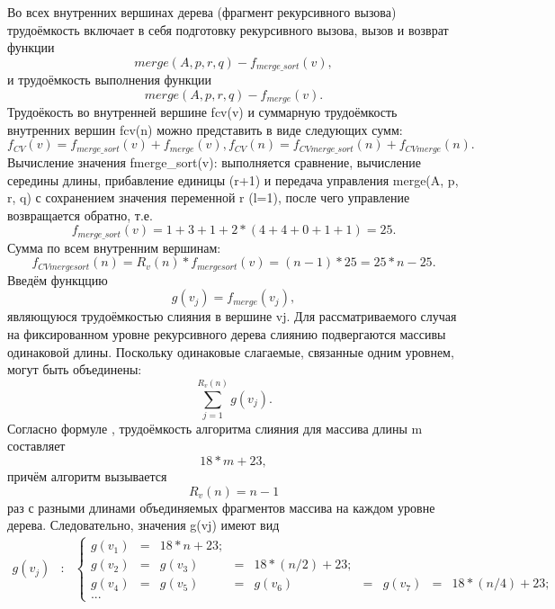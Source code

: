 \documentclass[12pt,a4paper]{scrartcl}
\begin{document}
Во всех внутренних вершинах дерева (фрагмент рекурсивного вызова) трудоёмкость включает в себя подготовку рекурсивного вызова, вызов и возврат функции 
\begin{equation*}
merge(A, p, r, q) - f_{merge\_sort}(v),
\end{equation*}
и трудоёмкость выполнения функции
\begin{equation*}
merge(A, p, r, q) - f_{merge}(v).
\end{equation*}
Трудоёкость во внутренней вершине fcv(v) и суммарную трудоёмкость внутренних вершин fcv(n) можно представить в виде следующих сумм:
\begin{equation}\label{eq2.11}
f_{CV}(v) = f_{merge\_sort}(v) + f_{merge}(v),
f_{CV}(n) = f_{CV merge\_sort}(n) + f_{CV merge}(n).
\end{equation}
Вычисление значения fmerge\_sort(v): выполняется сравнение, вычисление середины длины, прибавление единицы (r+1) и передача управления merge(A, p, r, q) с сохранением значения переменной r (l=1), после чего управление возвращается обратно, т.е.
\begin{equation}\label{eq2.12}
f_{merge\_sort}(v) = 1 + 3 + 1 + 2*(4 + 4 + 0 + 1 + 1) = 25.
\end{equation}
Сумма по всем внутренним вершинам:
\begin{equation}\label{eq2.13}
f_{CV mergesort}(n) = R_v(n)*f_{mergesort}(v) = (n-1)*25 = 25*n - 25.
\end{equation}
Введём функццию
\begin{equation}\label{eq2.14}
g(v_j) = f_{merge}(v_j),
\end{equation}
являющуюся трудоёмкостью слияния в вершине vj. Для рассматриваемого случая на фиксированном уровне рекурсивного дерева слиянию подвергаются массивы одинаковой длины. Поскольку одинаковые слагаемые, связанные одним уровнем, могут быть объединены:
\begin{equation}\label{eq2.15}
\sum \limits_{j=1}^{R_v(n)} g(v_j).
\end{equation}
Согласно формуле \label{eq2.1} , трудоёмкость алгоритма слияния для массива длины m составляет 
\begin{equation*}
18*m + 23,
\end{equation*}
причём алгоритм вызывается
\begin{equation*}
R_v(n) = n - 1
\end{equation*}
раз с разными длинами объединяемых фрагментов массива на каждом уровне дерева. Следовательно, значения g(vj) имеют вид
\begin{equation}\label{eq2.16}
\begin{matrix}
    g(v_j) & :
    & \left\{
    \begin{matrix}
    g(v_1) & = & 18*n + 23; \\
    g(v_2) & = & g(v_3) & = & 18*(n/2) + 23;\\
    g(v_4) & = & g(v_5) & = & g(v_6) & = & g(v_7) & = & 18*(n/4) + 23; \\
    ...
    \end{matrix} \right.
    \end{matrix}
\end{equation}
\end{document}
